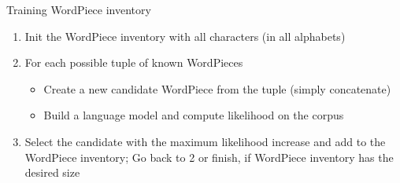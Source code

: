 \documentclass[12pt]{beamer}
\begin{document}
\begin{frame}{Training WordPiece inventory}
	
	\begin{enumerate}
		\item Init the WordPiece inventory with all characters (in all alphabets)
		\item For each possible tuple of known WordPieces
		\begin{itemize}
			\item Create a new candidate WordPiece from the tuple (simply concatenate)
			\item Build a language model and compute likelihood on the corpus
		\end{itemize}
		\item Select the candidate with the maximum likelihood increase and add to the WordPiece inventory; Go back to 2 or finish, if WordPiece inventory has the desired size
	\end{enumerate}
	
	
	\bigskip
	
	\scriptsize{}
	
\end{frame}
\end{document}

